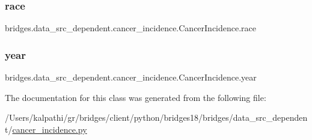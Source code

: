 \subsubsection{\texorpdfstring{race}{race}}
{\footnotesize\ttfamily bridges.\+data\+\_\+src\+\_\+dependent.\+cancer\+\_\+incidence.\+Cancer\+Incidence.\+race}

\mbox{\label{classbridges_1_1data__src__dependent_1_1cancer__incidence_1_1_cancer_incidence_a962b7cd1837e9d964bd01b9e285c7fa9}} 
\subsubsection{\texorpdfstring{year}{year}}
{\footnotesize\ttfamily bridges.\+data\+\_\+src\+\_\+dependent.\+cancer\+\_\+incidence.\+Cancer\+Incidence.\+year}



The documentation for this class was generated from the following file\+:\begin{DoxyCompactItemize}
\item 
/\+Users/kalpathi/gr/bridges/client/python/bridges18/bridges/data\+\_\+src\+\_\+dependent/\mbox{\hyperlink{cancer__incidence_8py}{cancer\+\_\+incidence.\+py}}\end{DoxyCompactItemize}
